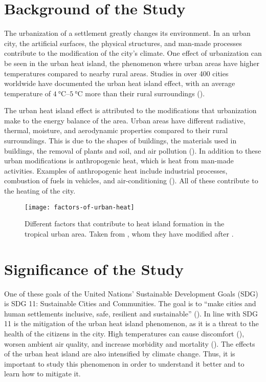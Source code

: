 \section{Background of the Study}
	The urbanization of a settlement greatly changes its environment.
	In an urban city, the artificial surfaces, the physical structures, and man-made processes contribute to the modification of the city's climate.
	One effect of urbanization can be seen in the urban heat island, the phenomenon where urban areas have higher temperatures compared to nearby rural areas.
	Studies in over 400 cities worldwide have documented the urban heat island effect,
		with an average temperature of $\qtyrange{4}{5}{\degreeCelsius}$ more than their rural surroundings (\cite{Santamouris2020}).
	
	The urban heat island effect is attributed to the modifications that urbanization make to the energy balance of the area.
	Urban areas have different radiative, thermal, moisture, and aerodynamic properties compared to their rural surroundings.
	This is due to the shapes of buildings, the materials used in buildings, the removal of plants and soil, and air pollution (\cite{Stewart2012}).
	In addition to these urban modifications is anthropogenic heat, which is heat from man-made activities.
	Examples of anthropogenic heat include industrial processes, combustion of fuels in vehicles, and air-conditioning (\cite{Oke2017urban}).
	All of these contribute to the heating of the city.
	
	\begin{figure}
		\centering
		\texttt{[image: factors-of-urban-heat]}
		\caption{
			Different factors that contribute to heat island formation in the tropical urban area.
			Taken from \textcite{Khan2021}, whom they have modified after \textcite{Kershaw2017}.
		}
		\label{fig:factors-of-urban-heat}
	\end{figure}
	
\section{Significance of the Study}
	One of these goals of the United Nations' Sustainable Development Goals (SDG) is SDG 11: Sustainable Cities and Communities.
	The goal is to ``make cities and human settlements inclusive, safe, resilient and sustainable'' (\cite{UN2015}).
	In line with SDG 11 is the mitigation of the urban heat island phenomenon, as it is a threat to the health of the citizens in the city.
	High temperatures can cause discomfort (\cite{Bhati2018}), worsen ambient air quality, and increase morbidity and mortality (\cite {Khan2021}).
	The effects of the urban heat island are also intensified by climate change.
	Thus, it is important to study this phenomenon in order to understand it better and to learn how to mitigate it.
	
